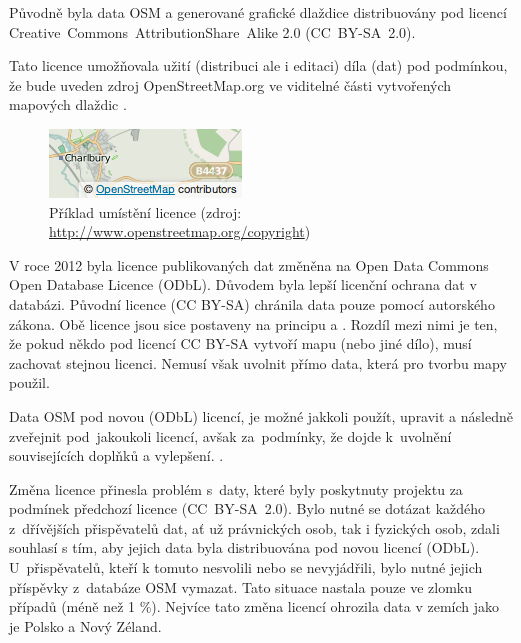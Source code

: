 Původně byla data OSM a generované grafické dlaždice distribuovány pod licencí
Creative~Commons~AttributionShare~Alike 2.0 (CC~BY-SA~2.0).

Tato licence umožňovala užití (distribuci ale i editaci) díla (dat) pod podmínkou,
že bude uveden zdroj OpenStreetMap.org ve viditelné části
vytvořených mapových dlaždic \cite{OSMlicence}.

  \begin{figure}[hbt]
    \centering
      \includegraphics[scale=0.75]{./pictures/attribution_example.png}
      \caption{Příklad umístění licence 
                (zdroj: \url{http://www.openstreetmap.org/copyright})}
      \label{fig:attribution_example}
  \end{figure} 

V roce 2012 byla licence publikovaných dat změněna na Open Data Commons
Open Database Licence (ODbL).
Důvodem byla lepší licenční ochrana dat v databázi. 
Původní licence (CC BY-SA) chránila data pouze pomocí autorského zákona. 
Obě licence jsou sice postaveny na principu  a . Rozdíl mezi nimi je ten, že pokud někdo pod licencí CC BY-SA vytvoří mapu (nebo jiné dílo), musí zachovat stejnou licenci.
Nemusí však uvolnit přímo data, která pro tvorbu mapy použil.

Data OSM pod novou (ODbL) licencí, je možné jakkoli použít, upravit
a následně zveřejnit pod~jakoukoli licencí,       %
avšak za~podmínky, že dojde k~uvolnění souvisejících doplňků a vylepšení. \cite{OSMlicenceChange}.

Změna licence přinesla problém
s~daty, které byly poskytnuty projektu za podmínek předchozí licence
(CC~BY-SA~2.0). Bylo nutné se dotázat každého z~dřívějších
přispěvatelů dat, ať už právnických osob, tak i fyzických osob,
zdali souhlasí s tím, aby jejich data byla distribuována pod novou licencí (ODbL).
U~přispěvatelů, kteří k tomuto nesvolili nebo se nevyjádřili,
bylo nutné jejich příspěvky z~databáze OSM vymazat.
Tato situace nastala pouze ve zlomku případů (méně než 1 \%).
Nejvíce tato změna licencí ohrozila data v zemích jako je Polsko a Nový Zéland. \cite {OSMlicenceIssue}

